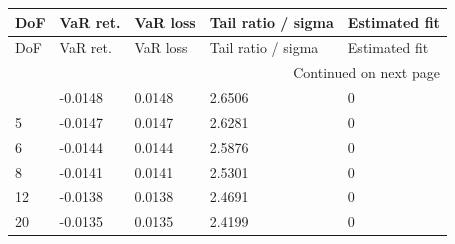 \begingroup
\footnotesize
\setlength{\tabcolsep}{2pt}
\begin{longtable}{@{}lllll@{}}
\toprule
DoF & VaR ret. & VaR loss & Tail ratio / sigma & Estimated fit \\
\midrule
\endfirsthead
\toprule
DoF & VaR ret. & VaR loss & Tail ratio / sigma & Estimated fit \\
\midrule
\endhead
\midrule
\multicolumn{5}{r}{Continued on next page} \\
\midrule
\endfoot
\bottomrule
\endlastfoot
4.5 & -0.0148 & 0.0148 & 2.6506 & 0 \\
5 & -0.0147 & 0.0147 & 2.6281 & 0 \\
6 & -0.0144 & 0.0144 & 2.5876 & 0 \\
8 & -0.0141 & 0.0141 & 2.5301 & 0 \\
12 & -0.0138 & 0.0138 & 2.4691 & 0 \\
20 & -0.0135 & 0.0135 & 2.4199 & 0 \\
\end{longtable}
\endgroup
